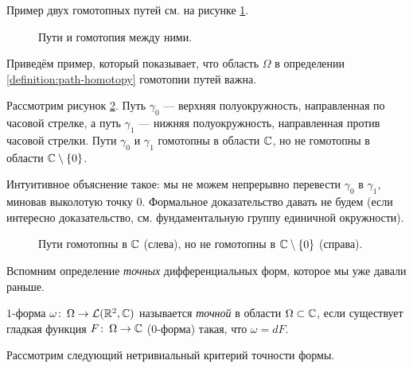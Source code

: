 Пример двух гомотопных путей см. на рисунке \ref{fig:path-homptopy}.

\begin{figure}[ht]
 \centering
 \caption{Пути и гомотопия между ними.}
 \label{fig:path-homptopy}
\end{figure}

Приведём пример, который показывает, что область $\Omega$ в определении \ref{definition:path-homotopy} гомотопии путей важна.

\begin{exmpl}
 Рассмотрим рисунок \ref{fig:paths-without-homptopy}. Путь $\gamma_0$ --- верхняя полуокружность, направленная по часовой стрелке, а путь $\gamma_1$ ---  нижняя полуокружность, направленная против часовой стрелки. Пути $\gamma_0$ и $\gamma_1$ гомотопны в области $\mathbb{C}$, но не гомотопны в области $\mathbb{C} \setminus \left\{ 0 \right\}$.

 Интуитивное объяснение такое: мы не можем непрерывно перевести $\gamma_0$ в $\gamma_1$, миновав выколотую точку $0$. Формальное доказательство давать не будем (если интересно доказательство, см. фундаментальную группу единичной окружности).
\end{exmpl}

\begin{figure}[ht]
 \centering
 \caption{Пути гомотопны в $\mathbb{C}$ (слева), но не гомотопны в $\mathbb{C} \setminus \left\{ 0 \right\}$ (справа).}
 \label{fig:paths-without-homptopy}
\end{figure}

Вспомним определение \textit{точных} дифференциальных форм, которое мы уже давали раньше.

\begin{df}
 $1$-форма $\omega \colon\, \Omega \to \mathcal{L}(\mathbb{R}^2, \mathbb{C})$ называется \textit{точной} в области $\Omega \subset \mathbb{C}$, если существует гладкая функция $F \colon\, \Omega \to \mathbb{C}$ ($0$-форма) такая, что $\omega = dF$.
\end{df}

Рассмотрим следующий нетривиальный критерий точности формы.

